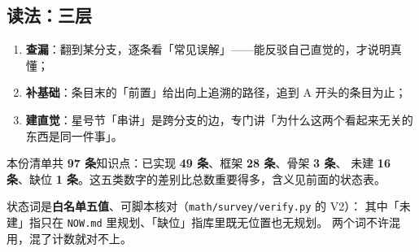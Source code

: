 \subsection{读法：三层}

\begin{enumerate}[label=（\arabic*）]
  \item \textbf{查漏}：翻到某分支，逐条看「常见误解」——能反驳自己直觉的，才说明真懂；
  \item \textbf{补基础}：条目末的「前置」给出向上追溯的路径，追到 A 开头的条目为止；
  \item \textbf{建直觉}：星号节「串讲」是跨分支的边，专门讲「为什么这两个看起来无关的东西是同一件事」。
\end{enumerate}

本份清单共 \textbf{97 条}知识点：已实现 \textbf{49 条}、框架 \textbf{28 条}、骨架 \textbf{3 条}、
未建 \textbf{16 条}、缺位 \textbf{1 条}。这五类数字的差别比总数重要得多，含义见前面的状态表。

状态词是\textbf{白名单五值}、可脚本核对（\texttt{math/survey/verify.py} 的 V2）：
其中「未建」指只在 \texttt{NOW.md} 里规划、「缺位」指库里既无位置也无规划。
两个词不许混用，混了计数就对不上。

